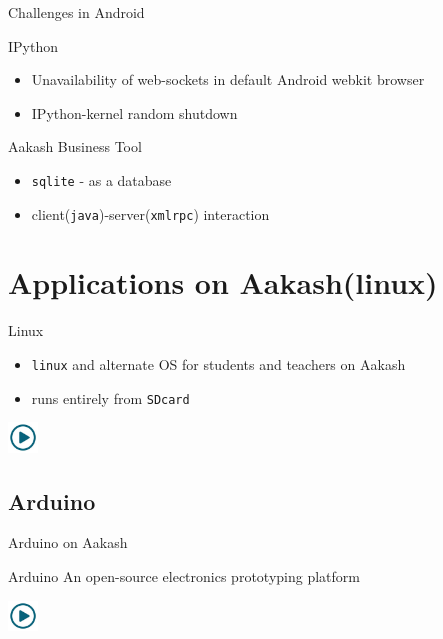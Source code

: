 \documentclass{beamer}
\begin{document}
  \begin{frame}{Challenges in Android}
    \begin{block}{IPython}
      \begin{itemize}
        \item Unavailability of web-sockets in default Android webkit
          browser
        \item IPython-kernel random shutdown
      \end{itemize}
    \end{block}
    \begin{block}{Aakash Business Tool}
      \begin{itemize}
        \item {\tt sqlite} - as a database 
        \item client({\tt java})-server({\tt xmlrpc}) interaction
      \end{itemize}
    \end{block}
  \end{frame}
\section{Applications on Aakash(linux)}
\begin{frame}{Linux}
  \begin{block}{}
    \begin{itemize}
    \item {\tt linux} and alternate OS for students and teachers on
      Aakash
    \item runs entirely from {\tt SDcard}
    \end{itemize}
  \end{block}
  \centerline{\href{file:///home/sachin/github/slides/techfest2013/linux.3gp}{\includegraphics[height=0.8cm,width=0.8cm]{play.jpg}}}
\end{frame}

\subsection{Arduino}
\begin{frame}{Arduino on Aakash}
  \begin{block}{Arduino}
    An open-source electronics prototyping platform
  \end{block}
  \centerline{\href{file:///home/sachin/github/slides/techfest2013/arduino.3gp}{\includegraphics[height=0.8cm,width=0.8cm]{play.jpg}}}
\end{frame}
\end{document}
